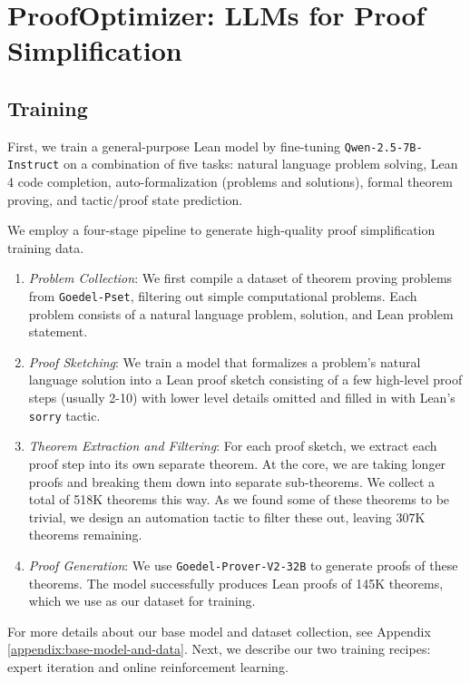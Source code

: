 
\section{ProofOptimizer: LLMs for Proof Simplification}

\subsection{Training}

 First, we train a general-purpose Lean model by fine-tuning \texttt{Qwen-2.5-7B-Instruct} on a combination of five tasks: natural language problem solving, Lean 4 code completion, auto-formalization (problems and solutions), formal theorem proving, and tactic/proof state prediction. 

 We employ a four-stage pipeline to generate high-quality proof simplification training data.
\begin{enumerate}[leftmargin=0.7cm, topsep=0pt]
\itemsep1pt 
    \item \textit{Problem Collection}: We first compile a dataset of theorem proving problems from \texttt{Goedel-Pset}, filtering out simple computational problems. Each problem consists of a natural language problem, solution, and Lean problem statement.
    \item \textit{Proof Sketching}: We train a model that formalizes a problem's natural language solution into a Lean proof sketch consisting of a few high-level proof steps (usually 2-10) with lower level details omitted and filled in with Lean's \texttt{sorry} tactic.
    \item \textit{Theorem Extraction and Filtering}: For each proof sketch, we extract each proof step into its own separate theorem. At the core, we are taking longer proofs and breaking them down into separate sub-theorems. We collect a total of 518K theorems this way. As we found some of these theorems to be trivial, we design an automation tactic to filter these out, leaving 307K theorems remaining.
    \item \textit{Proof Generation}: We use \texttt{Goedel-Prover-V2-32B} to generate proofs of these theorems. The model successfully produces Lean proofs of 145K theorems, which we use as our dataset for training.
\end{enumerate}

For more details about our base model and dataset collection, see Appendix \ref{appendix:base-model-and-data}. Next, we describe our two training recipes: expert iteration and online reinforcement learning.

